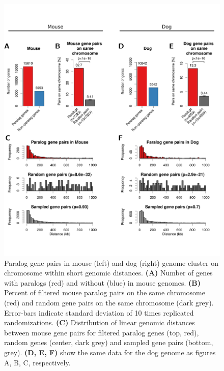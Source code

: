 \documentclass[a4paper,twoside=true,openright,parskip=full,chapterprefix=true,11pt,headings=normal,bibliography=totoc,listof=totoc,titlepage=on,captions=tableabove,draft=false]{scrreprt}
\theoremstyle{definition}
\theoremstyle{definition}
\theoremstyle{definition}
\theoremstyle{remark}
\begin{document}
\begin{figure}

{\centering \includegraphics[width=0.8\linewidth]{figures/paralog/SI/figS11} 

}

\caption{Paralog gene pairs in mouse (left) and dog (right)
genome cluster on chromosome within short genomic distances.
\textbf{(A)} Number of genes with paralogs (red) and without (blue) in
mouse genomes. \textbf{(B)} Percent of filtered mouse paralog pairs on
the same chromosome (red) and random gene pairs on the same chromosome
(dark grey). Error-bars indicate standard deviation of 10 times
replicated randomizations. \textbf{(C)} Distribution of linear genomic
distances between mouse gene pairs for filtered paralog genes (top,
red), random genes (center, dark grey) and sampled gene pairs (bottom,
grey). \textbf{(D, E, F)} show the same data for the dog genome as
figures A, B, C, respectively.}\label{fig:paralogsSpecies}
\end{figure}
\end{document}
